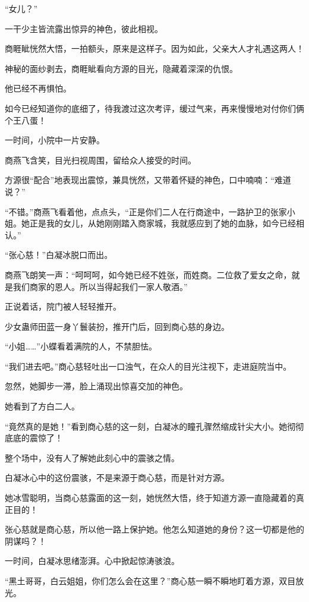 
\begin{this_body}

“女儿？”

一干少主皆流露出惊异的神色，彼此相视。

商睚眦恍然大悟，一拍额头，原来是这样子。因为如此，父亲大人才礼遇这两人！

神秘的面纱剥去，商睚眦看向方源的目光，隐藏着深深的仇恨。

他已经不再惧怕。

如今已经知道你的底细了，待我渡过这次考评，缓过气来，再来慢慢地对付你们俩个王八蛋！

一时间，小院中一片安静。

商燕飞含笑，目光扫视周围，留给众人接受的时间。

方源很“配合”地表现出震惊，兼具恍然，又带着怀疑的神色，口中喃喃：“难道说？”

“不错。”商燕飞看着他，点点头，“正是你们二人在行商途中，一路护卫的张家小姐。她正是我的女儿，从她刚刚踏入商家城，我就感应到了她的血脉，如今已经相认。”

“张心慈！”白凝冰脱口而出。

商燕飞朗笑一声：“呵呵呵，如今她已经不姓张，而姓商。二位救了爱女之命，就是我们商家的恩人。所以当得起我们一家人敬酒。”

正说着话，院门被人轻轻推开。

少女蛊师田蓝一身丫鬟装扮，推开门后，回到商心慈的身边。

“小姐……”小蝶看着满院的人，不禁胆怯。

“我们进去吧。”商心慈轻吐出一口浊气，在众人的目光注视下，走进庭院当中。

忽然，她脚步一滞，脸上涌现出惊喜交加的神色。

她看到了方白二人。

“竟然真的是她！”看到商心慈的这一刻，白凝冰的瞳孔骤然缩成针尖大小。她彻彻底底的震惊了！

整个场中，没有人了解她此刻心中的震骇之情。

白凝冰心中的这份震骇，不是来源于商心慈，而是针对方源。

她冰雪聪明，当商心慈露面的这一刻，她恍然大悟，终于知道方源一直隐藏着的真正目的！

张心慈就是商心慈，所以他一路上保护她。他怎么知道她的身份？这一切都是他的阴谋吗？！

一时间，白凝冰思绪澎湃。心中掀起惊涛骇浪。

“黑土哥哥，白云姐姐，你们怎么会在这里？”商心慈一瞬不瞬地盯着方源，双目放光。


\end{this_body}
